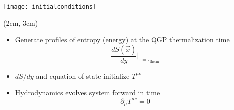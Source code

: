 \documentclass[svgnames]{beamer}
\begin{document}
\begin{frame}
 \centering
 \vspace{-1 in}
 \texttt{[image: initialconditions]}
 
 \begin{textblock*}{0.7\linewidth}(2cm,-3cm)
  \begin{itemize}
   \item Generate profiles of entropy (energy) at the QGP thermalization time
   \begin{equation*}
    \frac{dS(\vec{x})}{dy} \bigg \vert_{\tau = \tau_\text{therm}}
   \end{equation*}
  \item $dS/dy$ and equation of state initialize $T^{\mu\nu}$
  \item Hydrodynamics evolves system forward in time 
  \begin{equation*}
   \partial_\mu T^{\mu \nu} = 0
  \end{equation*}

  \end{itemize}
 \end{textblock*}
\end{frame}
\end{document}
